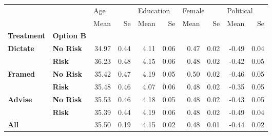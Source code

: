 \begin{tabular}{llrrrrrrrr}
\toprule
    &      & \multicolumn{2}{l}{Age} & \multicolumn{2}{l}{Education} & \multicolumn{2}{l}{Female} & \multicolumn{2}{l}{Political} \\
    &      &  Mean &   Se &      Mean &   Se &   Mean &   Se &      Mean &   Se \\
\textbf{Treatment} & \textbf{Option B} &       &      &           &      &        &      &           &      \\
\midrule
\textbf{Dictate} & \textbf{No Risk} & 34.97 & 0.44 &      4.11 & 0.06 &   0.47 & 0.02 &     -0.49 & 0.04 \\
    & \textbf{Risk} & 36.23 & 0.48 &      4.15 & 0.06 &   0.48 & 0.02 &     -0.42 & 0.05 \\
\textbf{Framed} & \textbf{No Risk} & 35.42 & 0.47 &      4.19 & 0.05 &   0.50 & 0.02 &     -0.46 & 0.05 \\
    & \textbf{Risk} & 35.48 & 0.46 &      4.07 & 0.06 &   0.48 & 0.02 &     -0.35 & 0.05 \\
\textbf{Advise} & \textbf{No Risk} & 35.53 & 0.46 &      4.18 & 0.05 &   0.48 & 0.02 &     -0.43 & 0.05 \\
    & \textbf{Risk} & 35.39 & 0.44 &      4.19 & 0.06 &   0.48 & 0.02 &     -0.49 & 0.04 \\
\textbf{All} &      & 35.50 & 0.19 &      4.15 & 0.02 &   0.48 & 0.01 &     -0.44 & 0.02 \\
\bottomrule
\end{tabular}
